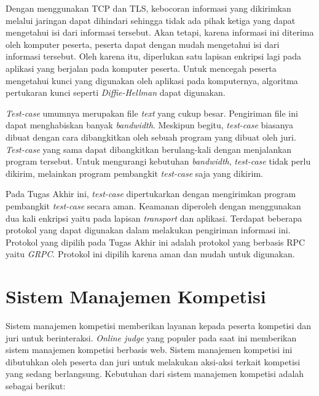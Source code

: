 \par Dengan menggunakan TCP dan TLS, kebocoran informasi yang dikirimkan melalui jaringan dapat dihindari sehingga tidak ada pihak ketiga yang dapat mengetahui isi dari informasi tersebut. Akan tetapi, karena informasi ini diterima oleh komputer peserta, peserta dapat dengan mudah mengetahui isi dari informasi tersebut. Oleh karena itu, diperlukan satu lapisan enkripsi lagi pada aplikasi yang berjalan pada komputer peserta. Untuk mencegah peserta mengetahui kunci yang digunakan oleh aplikasi pada komputernya, algoritma pertukaran kunci seperti \textit{Diffie-Hellman} dapat digunakan.

\par \textit{Test-case} umumnya merupakan file \textit{text} yang cukup besar. Pengiriman file ini dapat menghabiskan banyak \textit{bandwidth}. Meskipun begitu, \textit{test-case} biasanya dibuat dengan cara dibangkitkan oleh sebuah program yang dibuat oleh juri. \textit{Test-case} yang sama dapat dibangkitkan berulang-kali dengan menjalankan program tersebut. Untuk mengurangi kebutuhan \textit{bandwidth}, \textit{test-case} tidak perlu dikirim, melainkan program pembangkit \textit{test-case} saja yang dikirim.

\par Pada Tugas Akhir ini, \textit{test-case} dipertukarkan dengan mengirimkan program pembangkit \textit{test-case} secara aman. Keamanan diperoleh dengan menggunakan dua kali enkripsi yaitu pada lapisan \textit{transport} dan aplikasi. Terdapat beberapa protokol yang dapat digunakan dalam melakukan pengiriman informasi ini. Protokol yang dipilih pada Tugas Akhir ini adalah protokol yang berbasis RPC yaitu \textit{GRPC}. Protokol ini dipilih karena aman dan mudah untuk digunakan.

\section{Sistem Manajemen Kompetisi}

\par Sistem manajemen kompetisi memberikan layanan kepada peserta kompetisi dan juri untuk berinteraksi. \textit{Online judge} yang populer pada saat ini memberikan sistem manajemen kompetisi berbasis web. Sistem manajemen kompetisi ini dibutuhkan oleh peserta dan juri untuk melakukan aksi-aksi terkait kompetisi yang sedang berlangsung. Kebutuhan dari sistem manajemen kompetisi adalah sebagai berikut:

